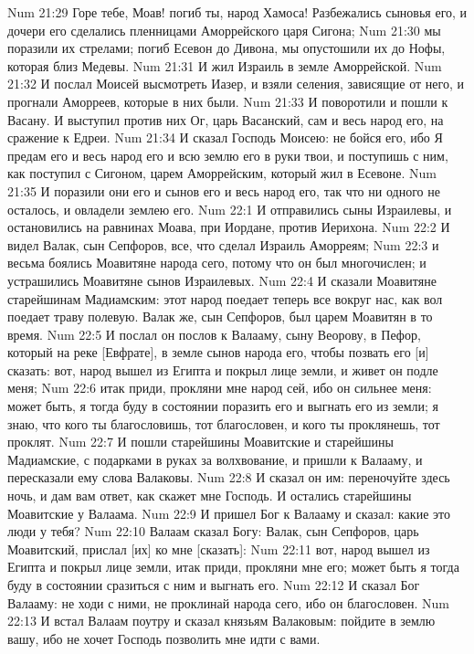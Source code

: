 Num 21:29  Горе тебе, Моав! погиб ты, народ Хамоса! Разбежались сыновья его, и дочери его сделались пленницами Аморрейского царя Сигона;
Num 21:30  мы поразили их стрелами; погиб Есевон до Дивона, мы опустошили их до Нофы, которая близ Медевы.
Num 21:31  И жил Израиль в земле Аморрейской.
Num 21:32  И послал Моисей высмотреть Иазер, и взяли селения, зависящие от него, и прогнали Аморреев, которые в них были.
Num 21:33  И поворотили и пошли к Васану. И выступил против них Ог, царь Васанский, сам и весь народ его, на сражение к Едреи.
Num 21:34  И сказал Господь Моисею: не бойся его, ибо Я предам его и весь народ его и всю землю его в руки твои, и поступишь с ним, как поступил с Сигоном, царем Аморрейским, который жил в Есевоне.
Num 21:35  И поразили они его и сынов его и весь народ его, так что ни одного не осталось, и овладели землею его.
Num 22:1  И отправились сыны Израилевы, и остановились на равнинах Моава, при Иордане, против Иерихона.
Num 22:2  И видел Валак, сын Сепфоров, все, что сделал Израиль Аморреям;
Num 22:3  и весьма боялись Моавитяне народа сего, потому что он был многочислен; и устрашились Моавитяне сынов Израилевых.
Num 22:4  И сказали Моавитяне старейшинам Мадиамским: этот народ поедает теперь все вокруг нас, как вол поедает траву полевую. Валак же, сын Сепфоров, был царем Моавитян в то время.
Num 22:5  И послал он послов к Валааму, сыну Веорову, в Пефор, который на реке [Евфрате], в земле сынов народа его, чтобы позвать его [и] сказать: вот, народ вышел из Египта и покрыл лице земли, и живет он подле меня;
Num 22:6  итак приди, прокляни мне народ сей, ибо он сильнее меня: может быть, я тогда буду в состоянии поразить его и выгнать его из земли; я знаю, что кого ты благословишь, тот благословен, и кого ты проклянешь, тот проклят.
Num 22:7  И пошли старейшины Моавитские и старейшины Мадиамские, с подарками в руках за волхвование, и пришли к Валааму, и пересказали ему слова Валаковы.
Num 22:8  И сказал он им: переночуйте здесь ночь, и дам вам ответ, как скажет мне Господь. И остались старейшины Моавитские у Валаама.
Num 22:9  И пришел Бог к Валааму и сказал: какие это люди у тебя?
Num 22:10  Валаам сказал Богу: Валак, сын Сепфоров, царь Моавитский, прислал [их] ко мне [сказать]:
Num 22:11  вот, народ вышел из Египта и покрыл лице земли, итак приди, прокляни мне его; может быть я тогда буду в состоянии сразиться с ним и выгнать его.
Num 22:12  И сказал Бог Валааму: не ходи с ними, не проклинай народа сего, ибо он благословен.
Num 22:13  И встал Валаам поутру и сказал князьям Валаковым: пойдите в землю вашу, ибо не хочет Господь позволить мне идти с вами.
